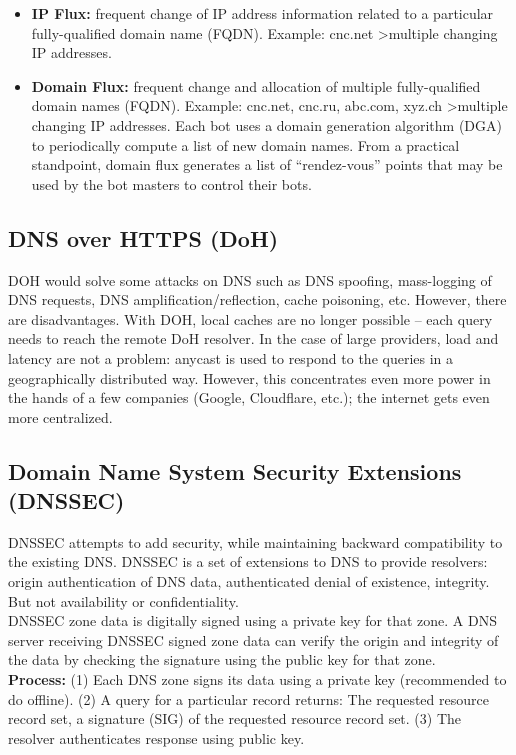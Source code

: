 \documentclass[11pt,oneside,a4paper]{article}
\begin{document}
\vspace{-\topsep}
\begin{itemize}
	\setlength{\itemsep}{0pt}
	\setlength{\parskip}{0pt}
	\item \textbf{IP Flux:} frequent change of IP address information related to a particular fully-qualified domain name (FQDN). Example: cnc.net \textgreater multiple changing IP addresses.
	\item \textbf{Domain Flux:} frequent change and allocation of multiple fully-qualified domain names (FQDN). Example: cnc.net, cnc.ru, abc.com, xyz.ch \textgreater multiple changing IP addresses. Each bot uses a domain generation algorithm (DGA) to periodically compute a list
	of new domain names. From a practical standpoint, domain flux generates a list of “rendez-vous” points that may be used by the bot masters to control their bots.
\end{itemize}
\vspace{-\topsep}

\subsection{DNS over HTTPS (DoH)}

DOH would solve some attacks on DNS such as DNS spoofing, mass-logging of DNS requests, DNS amplification/reflection, cache poisoning, etc. However, there are disadvantages. With DOH, local caches are no longer possible – each query needs to reach the remote DoH resolver. In the case of large providers, load and latency are not a problem: anycast is used to respond to the queries in a geographically distributed way. However, this concentrates even more power in the hands of a few companies (Google, Cloudflare, etc.); the internet gets even more centralized.

\subsection{Domain Name System Security Extensions (DNSSEC)}

DNSSEC attempts to add security, while maintaining backward compatibility to the
existing DNS. DNSSEC is a set of extensions to DNS to provide resolvers: origin authentication of DNS data, authenticated denial of existence, integrity. But not availability or confidentiality.\\
DNSSEC zone data is digitally signed using a private key for that zone. A DNS server receiving DNSSEC signed zone data can verify the origin and integrity of the data by checking the signature using the public key for that zone.\\
\textbf{Process:} (1) Each DNS zone signs its data using a private key (recommended to do offline). (2) A query for a particular record returns: The requested resource record set, a signature (SIG) of the requested resource record set. (3) The resolver authenticates response using public key.
\end{document}
